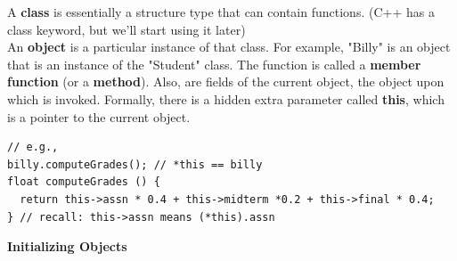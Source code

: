 \documentclass[english, 11pt]{article}
\begin{document}
A \textbf{class} is essentially a structure type that can contain functions. (C++ has a class keyword, but we'll start using it later) \\

An \textbf{object} is a particular instance of that class. For example, "Billy" is an object that is an instance of the "Student" class. The function  is called a \textbf{member function} (or a \textbf{method}). Also,  are fields of the current object, the object upon which  is invoked. Formally, there is a hidden extra parameter called \textbf{this}, which is a pointer to the current object.
\begin{lstlisting}
// e.g.,
billy.computeGrades(); // *this == billy
float computeGrades () {
  return this->assn * 0.4 + this->midterm *0.2 + this->final * 0.4;
} // recall: this->assn means (*this).assn
\end{lstlisting}

\textbf{Initializing Objects}
\end{document}
